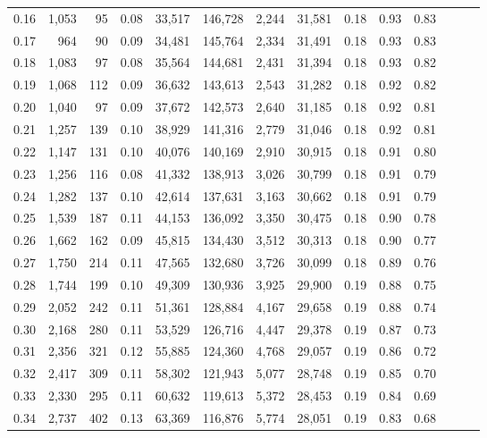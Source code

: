 \begin{tabular}{rrrrrrrrrrrrrr}
0.16 &  1,053 &   95 &  0.08 &   33,517 &  146,728 &   2,244 &  31,581 &  0.18 &  0.93 &      0.83 \\
0.17 &    964 &   90 &  0.09 &   34,481 &  145,764 &   2,334 &  31,491 &  0.18 &  0.93 &      0.83 \\
0.18 &  1,083 &   97 &  0.08 &   35,564 &  144,681 &   2,431 &  31,394 &  0.18 &  0.93 &      0.82 \\
0.19 &  1,068 &  112 &  0.09 &   36,632 &  143,613 &   2,543 &  31,282 &  0.18 &  0.92 &      0.82 \\
0.20 &  1,040 &   97 &  0.09 &   37,672 &  142,573 &   2,640 &  31,185 &  0.18 &  0.92 &      0.81 \\
0.21 &  1,257 &  139 &  0.10 &   38,929 &  141,316 &   2,779 &  31,046 &  0.18 &  0.92 &      0.81 \\
0.22 &  1,147 &  131 &  0.10 &   40,076 &  140,169 &   2,910 &  30,915 &  0.18 &  0.91 &      0.80 \\
0.23 &  1,256 &  116 &  0.08 &   41,332 &  138,913 &   3,026 &  30,799 &  0.18 &  0.91 &      0.79 \\
0.24 &  1,282 &  137 &  0.10 &   42,614 &  137,631 &   3,163 &  30,662 &  0.18 &  0.91 &      0.79 \\
0.25 &  1,539 &  187 &  0.11 &   44,153 &  136,092 &   3,350 &  30,475 &  0.18 &  0.90 &      0.78 \\
0.26 &  1,662 &  162 &  0.09 &   45,815 &  134,430 &   3,512 &  30,313 &  0.18 &  0.90 &      0.77 \\
0.27 &  1,750 &  214 &  0.11 &   47,565 &  132,680 &   3,726 &  30,099 &  0.18 &  0.89 &      0.76 \\
0.28 &  1,744 &  199 &  0.10 &   49,309 &  130,936 &   3,925 &  29,900 &  0.19 &  0.88 &      0.75 \\
0.29 &  2,052 &  242 &  0.11 &   51,361 &  128,884 &   4,167 &  29,658 &  0.19 &  0.88 &      0.74 \\
0.30 &  2,168 &  280 &  0.11 &   53,529 &  126,716 &   4,447 &  29,378 &  0.19 &  0.87 &      0.73 \\
0.31 &  2,356 &  321 &  0.12 &   55,885 &  124,360 &   4,768 &  29,057 &  0.19 &  0.86 &      0.72 \\
0.32 &  2,417 &  309 &  0.11 &   58,302 &  121,943 &   5,077 &  28,748 &  0.19 &  0.85 &      0.70 \\
0.33 &  2,330 &  295 &  0.11 &   60,632 &  119,613 &   5,372 &  28,453 &  0.19 &  0.84 &      0.69 \\
0.34 &  2,737 &  402 &  0.13 &   63,369 &  116,876 &   5,774 &  28,051 &  0.19 &  0.83 &      0.68 \\

\end{tabular}
